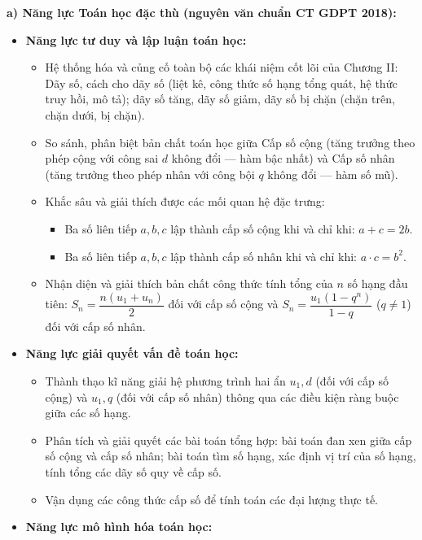 \documentclass[12pt, a4paper]{article}
\begin{document}
\textbf{a) Năng lực Toán học đặc thù (nguyên văn chuẩn CT GDPT 2018):}
\begin{itemize}[leftmargin=1.5em]
    \item \textbf{Năng lực tư duy và lập luận toán học:}
    \begin{itemize}
        \item Hệ thống hóa và củng cố toàn bộ các khái niệm cốt lõi của Chương II: Dãy số, cách cho dãy số (liệt kê, công thức số hạng tổng quát, hệ thức truy hồi, mô tả); dãy số tăng, dãy số giảm, dãy số bị chặn (chặn trên, chặn dưới, bị chặn).
        \item So sánh, phân biệt bản chất toán học giữa Cấp số cộng (tăng trưởng theo phép cộng với công sai $d$ không đổi --- hàm bậc nhất) và Cấp số nhân (tăng trưởng theo phép nhân với công bội $q$ không đổi --- hàm số mũ).
        \item Khắc sâu và giải thích được các mối quan hệ đặc trưng:
        \begin{itemize}
            \item Ba số liên tiếp $a, b, c$ lập thành cấp số cộng khi và chỉ khi: $a + c = 2b$.
            \item Ba số liên tiếp $a, b, c$ lập thành cấp số nhân khi và chỉ khi: $a \cdot c = b^2$.
        \end{itemize}
        \item Nhận diện và giải thích bản chất công thức tính tổng của $n$ số hạng đầu tiên: $S_n = \dfrac{n(u_1 + u_n)}{2}$ đối với cấp số cộng và $S_n = \dfrac{u_1(1 - q^n)}{1 - q}$ ($q \neq 1$) đối với cấp số nhân.
    \end{itemize}
    \item \textbf{Năng lực giải quyết vấn đề toán học:}
    \begin{itemize}
        \item Thành thạo kĩ năng giải hệ phương trình hai ẩn $u_1, d$ (đối với cấp số cộng) và $u_1, q$ (đối với cấp số nhân) thông qua các điều kiện ràng buộc giữa các số hạng.
        \item Phân tích và giải quyết các bài toán tổng hợp: bài toán đan xen giữa cấp số cộng và cấp số nhân; bài toán tìm số hạng, xác định vị trí của số hạng, tính tổng các dãy số quy về cấp số.
        \item Vận dụng các công thức cấp số để tính toán các đại lượng thực tế.
    \end{itemize}
    \item \textbf{Năng lực mô hình hóa toán học:}
    \begin{itemize}

\end{itemize}
\end{itemize}
\end{document}
